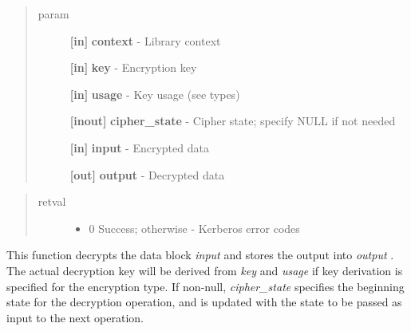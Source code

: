 \documentclass[letterpaper,10pt,english]{sphinxmanual}
\begin{document}
\begin{fulllineitems}
\label{appdev/refs/api/krb5_k_decrypt:c.krb5_k_decrypt}
\end{fulllineitems}

\begin{quote}\begin{description}
\item[{param}] \leavevmode
\textbf{{[}in{]}} \textbf{context} - Library context

\textbf{{[}in{]}} \textbf{key} - Encryption key

\textbf{{[}in{]}} \textbf{usage} - Key usage (see  types)

\textbf{{[}inout{]}} \textbf{cipher\_state} - Cipher state; specify NULL if not needed

\textbf{{[}in{]}} \textbf{input} - Encrypted data

\textbf{{[}out{]}} \textbf{output} - Decrypted data

\end{description}\end{quote}
\begin{quote}\begin{description}
\item[{retval}] \leavevmode\begin{itemize}
\item {} 
0   Success; otherwise - Kerberos error codes

\end{itemize}

\end{description}\end{quote}

This function decrypts the data block \emph{input} and stores the output into \emph{output} . The actual decryption key will be derived from \emph{key} and \emph{usage} if key derivation is specified for the encryption type. If non-null, \emph{cipher\_state} specifies the beginning state for the decryption operation, and is updated with the state to be passed as input to the next operation.
\end{document}
